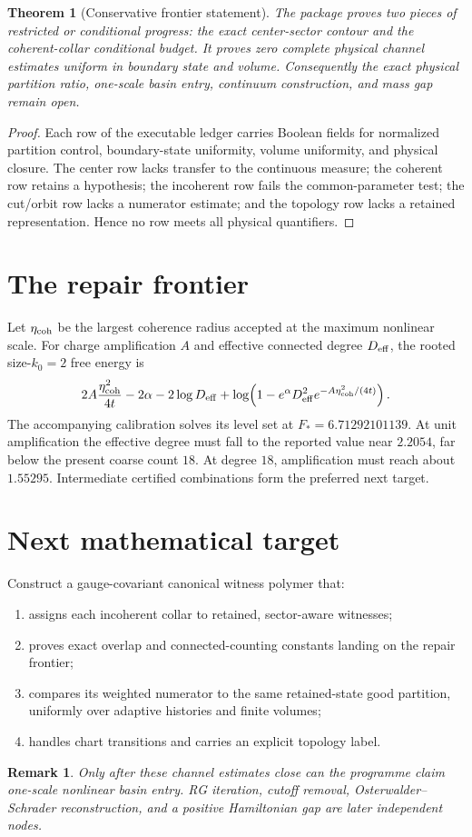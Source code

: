 \documentclass[11pt]{article}
\newtheorem{theorem}{Theorem}
\newtheorem{remark}{Remark}
\begin{document}
\begin{theorem}[Conservative frontier statement]
The package proves two pieces of restricted or conditional progress: the exact
center-sector contour and the coherent-collar conditional budget.  It proves
zero complete physical channel estimates uniform in boundary state and volume.
Consequently the exact physical partition ratio, one-scale basin entry,
continuum construction, and mass gap remain open.
\end{theorem}

\begin{proof}
Each row of the executable ledger carries Boolean fields for normalized
partition control, boundary-state uniformity, volume uniformity, and physical
closure.  The center row lacks transfer to the continuous measure; the
coherent row retains a hypothesis; the incoherent row fails the common-parameter
test; the cut/orbit row lacks a numerator estimate; and the topology row lacks
a retained representation.  Hence no row meets all physical quantifiers.
\end{proof}

\section{The repair frontier}

Let $\eta_{\rm coh}$ be the largest coherence radius accepted at the maximum
nonlinear scale.  For charge amplification $A$ and effective connected degree
$D_{\rm eff}$, the rooted size-$k_0=2$ free energy is
\[
 2A\frac{\eta_{\rm coh}^2}{4t}-2\alpha-2\log D_{\rm eff}
 +\log\!\left(1-e^\alpha D_{\rm eff}^2
 e^{-A\eta_{\rm coh}^2/(4t)}\right).
\]
The accompanying calibration solves its level set at
$F_*=6.71292101139$.  At unit amplification the effective degree must fall to
the reported value near $2.2054$, far below the present coarse count $18$.
At degree $18$, amplification must reach about $1.55295$.  Intermediate
certified combinations form the preferred next target.

\section{Next mathematical target}

Construct a gauge-covariant canonical witness polymer that:
\begin{enumerate}
\item assigns each incoherent collar to retained, sector-aware witnesses;
\item proves exact overlap and connected-counting constants landing on the
      repair frontier;
\item compares its weighted numerator to the same retained-state good
      partition, uniformly over adaptive histories and finite volumes;
\item handles chart transitions and carries an explicit topology label.
\end{enumerate}

\begin{remark}
Only after these channel estimates close can the programme claim one-scale
nonlinear basin entry.  RG iteration, cutoff removal, Osterwalder--Schrader
reconstruction, and a positive Hamiltonian gap are later independent nodes.
\end{remark}
\end{document}
